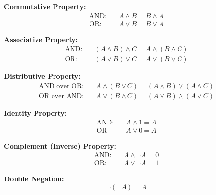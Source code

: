         \textbf{Commutative Property:}
        \begin{align*}
        \text{AND:} \quad & A \land B = B \land A \\
        \text{OR:} \quad & A \lor B = B \lor A
        \end{align*}

        \textbf{Associative Property:}
        \begin{align*}
        \text{AND:} \quad & (A \land B) \land C = A \land (B \land C) \\
        \text{OR:} \quad & (A \lor B) \lor C = A \lor (B \lor C)
        \end{align*}

        \textbf{Distributive Property:}
        \begin{align*}
        \text{AND over OR:} \quad & A \land (B \lor C) = (A \land B) \lor (A \land C) \\
        \text{OR over AND:} \quad & A \lor (B \land C) = (A \lor B) \land (A \lor C)
        \end{align*}

        \textbf{Identity Property:}
        \begin{align*}
        \text{AND:} \quad & A \land 1 = A \\
        \text{OR:} \quad & A \lor 0 = A
        \end{align*}

        \textbf{Complement (Inverse) Property:}
        \begin{align*}
        \text{AND:} \quad & A \land \neg A = 0 \\
        \text{OR:} \quad & A \lor \neg A = 1
        \end{align*}

        \textbf{Double Negation:}
        \[
        \neg(\neg A) = A
        \]